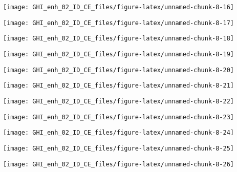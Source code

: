\documentclass[
  10pt,
  a4paper,oneside]{article}
\begin{document}
\begin{center}\texttt{[image: GHI\_enh\_02\_ID\_CE\_files/figure-latex/unnamed-chunk-8-16]} \end{center}

\begin{center}\texttt{[image: GHI\_enh\_02\_ID\_CE\_files/figure-latex/unnamed-chunk-8-17]} \end{center}

\begin{center}\texttt{[image: GHI\_enh\_02\_ID\_CE\_files/figure-latex/unnamed-chunk-8-18]} \end{center}

\begin{center}\texttt{[image: GHI\_enh\_02\_ID\_CE\_files/figure-latex/unnamed-chunk-8-19]} \end{center}

\begin{center}\texttt{[image: GHI\_enh\_02\_ID\_CE\_files/figure-latex/unnamed-chunk-8-20]} \end{center}

\begin{center}\texttt{[image: GHI\_enh\_02\_ID\_CE\_files/figure-latex/unnamed-chunk-8-21]} \end{center}

\begin{center}\texttt{[image: GHI\_enh\_02\_ID\_CE\_files/figure-latex/unnamed-chunk-8-22]} \end{center}

\begin{center}\texttt{[image: GHI\_enh\_02\_ID\_CE\_files/figure-latex/unnamed-chunk-8-23]} \end{center}

\begin{center}\texttt{[image: GHI\_enh\_02\_ID\_CE\_files/figure-latex/unnamed-chunk-8-24]} \end{center}

\begin{center}\texttt{[image: GHI\_enh\_02\_ID\_CE\_files/figure-latex/unnamed-chunk-8-25]} \end{center}

\begin{center}\texttt{[image: GHI\_enh\_02\_ID\_CE\_files/figure-latex/unnamed-chunk-8-26]} \end{center}
\end{document}
